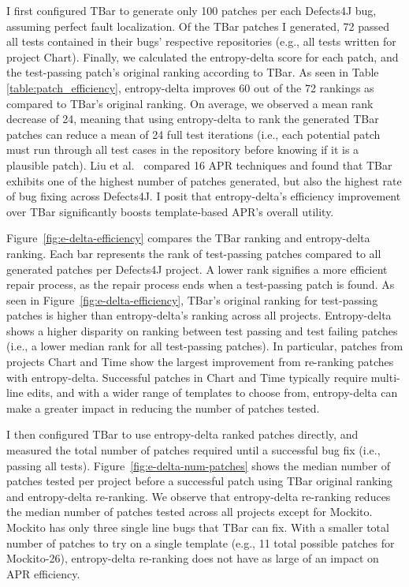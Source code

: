 \documentclass[12pt,openany,oneside,table]{cmuthesis}
\begin{document}
I first configured TBar to generate only 100 patches per each Defects4J bug,
assuming perfect fault localization. Of the TBar patches I generated, 72
passed all tests contained in their bugs' respective repositories (e.g., all
tests written for project Chart). Finally, we calculated the entropy-delta score
for each patch, and the test-passing patch's original ranking according to
TBar. As seen in Table \ref{table:patch_efficiency}, entropy-delta improves 60
out of the 72 rankings as compared to TBar's original ranking. On average, we
observed a mean rank decrease of 24, meaning that using entropy-delta to rank
the generated TBar patches can reduce a mean of 24 full test iterations (i.e.,
each potential patch must run through all test cases in the repository before
knowing if it is a plausible patch). Liu et
al.~\cite{efficiency} compared 16 APR techniques and found that TBar exhibits one of the highest number of patches generated, but also the highest rate of bug fixing across Defects4J.
I posit that entropy-delta's efficiency improvement over TBar significantly boosts template-based APR's overall utility.

Figure~\ref{fig:e-delta-efficiency} compares the TBar ranking
and entropy-delta ranking. Each bar represents the rank of test-passing patches
compared to all generated patches per Defects4J project. A lower rank signifies a
more efficient repair process, as the repair process ends when a test-passing
patch is found. As seen in Figure~\ref{fig:e-delta-efficiency}, TBar's original
ranking for test-passing patches is higher than entropy-delta's ranking across
all projects. Entropy-delta shows a higher disparity on ranking between test
passing and test failing patches (i.e., a lower median rank for all test-passing
patches). In particular, patches from projects Chart and Time show the largest
improvement from re-ranking patches with entropy-delta. Successful patches in
Chart and Time typically require multi-line edits, and with a wider range of
templates to choose from, entropy-delta can make a greater impact in reducing
the number of patches tested.

I then configured TBar to use entropy-delta ranked patches directly, and
measured the total number of patches required until a successful bug fix (i.e.,
passing all tests). Figure~\ref{fig:e-delta-num-patches} shows the median number
of patches tested per project before a successful patch using TBar original
ranking and entropy-delta re-ranking. We observe that entropy-delta re-ranking
reduces the median number of patches tested across all projects except for
Mockito. Mockito has only three single line bugs that TBar can fix. With a smaller total number of patches
to try on a single template (e.g., 11 total possible patches for Mockito-26),
entropy-delta re-ranking does not have as large of an impact on APR efficiency. 
\end{document}
